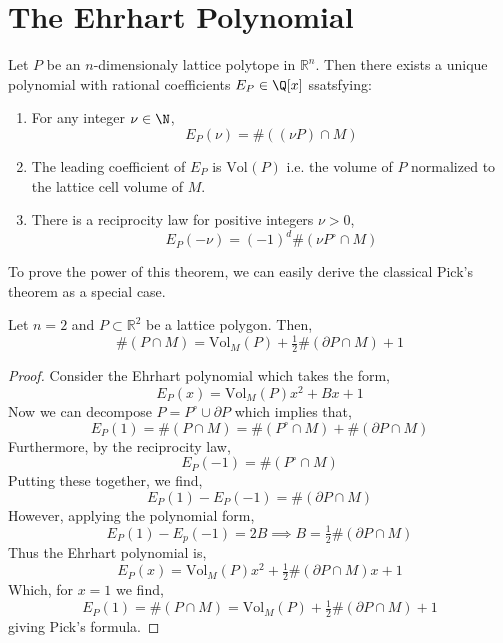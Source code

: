 \documentclass[12pt]{article}
\begin{document}
\section{The Ehrhart Polynomial}

\newcommand{\Cone}{\mathrm{Cone}}
\newcommand{\Vol}[2]{\mathrm{Vol}_{#1}\left( #2 \right)}
\newcommand{\R}{\mathbb{R}}
\newcommand{\Rat}[1]{\mathrm{Rat}\left(#1\right)}
\newcommand{\inner}[2]{\left< #1, #2 \right>}



\begin{theorem}
Let $P$ be an $n$-dimensionaly lattice polytope in $\R^n$. Then there exists a unique polynomial with rational coefficients $E_P \in \Q[x]$ ssatsfying:
\begin{enumerate}
\item For any integer $\nu \in \N$,
\[ E_P(\nu) = \# \left( (\nu P) \cap M \right) \]
\item The leading coefficient of $E_P$ is $\Vol{}{P}$ i.e. the volume of $P$ normalized to the lattice cell volume of $M$.
\item There is a reciprocity law for positive integers $\nu > 0$,
\[ E_P(-\nu) = (-1)^d \# \left( \nu P^\circ \cap M \right) \] 
\end{enumerate} 
\end{theorem}


\begin{remark}
To prove the power of this theorem, we can easily derive the classical Pick's theorem as a special case.
\end{remark}

\begin{theorem}[Pick]
Let $n = 2$ and $P \subset \R^2$ be a lattice polygon. Then,
\[ \# (P \cap M) = \Vol{M}{P} + \tfrac{1}{2} \# (\partial P \cap M) + 1 \] 
\end{theorem}

\begin{proof}
Consider the Ehrhart polynomial which takes the form,
\[ E_P(x) = \Vol{M}{P} x^2 + B x + 1 \]
Now we can decompose $P = P^\circ \cup \partial P$ which implies that,
\[ E_P(1) = \# \left( P \cap M \right) = \# \left( P^\circ \cap M \right) + \# \left( \partial P \cap M \right) \]
Furthermore, by the reciprocity law,
\[ E_P(-1) = \# \left( P^\circ \cap M \right) \]
Putting these together, we find,
\[ E_P(1) - E_P(-1) = \# \left( \partial P \cap M \right) \]
However, applying the polynomial form,
\[ E_P(1) - E_p(-1) = 2 B \implies B = \tfrac{1}{2} \# \left( \partial P \cap M \right) \]
Thus the Ehrhart polynomial is,
\[ E_P(x) = \Vol{M}{P} x^2 + \tfrac{1}{2} \# \left( \partial P \cap M \right) x + 1 \]
Which, for $x = 1$ we find,
\[ E_P(1) = \# \left( P \cap M \right) = \Vol{M}{P} + \tfrac{1}{2} \# \left( \partial P \cap M \right)  + 1 \]
giving Pick's formula. 
\end{proof}
\end{document}
